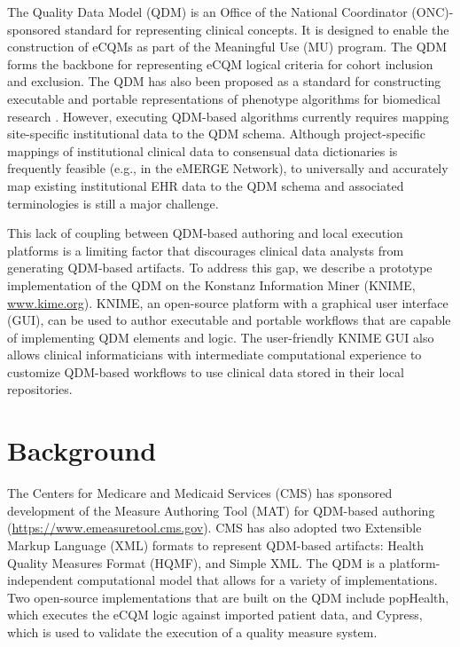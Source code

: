 \documentclass{article}
\begin{document}
The Quality Data Model (QDM) is an Office of the National Coordinator (ONC)-sponsored standard for representing clinical concepts\cite{_quality_2014}. It is designed to enable the construction of eCQMs as part of the Meaningful Use (MU) program. The QDM forms the backbone for representing eCQM logical criteria for cohort inclusion and exclusion. The QDM has also been proposed as a standard for constructing executable and portable representations of phenotype algorithms for biomedical research \cite{thompson_evaluation_2012}. However, executing QDM-based algorithms currently requires mapping site-specific institutional data to the QDM schema. Although project-specific mappings of institutional clinical data to consensual data dictionaries is frequently feasible (e.g., in the eMERGE Network\cite{kho_electronic_2011}), to universally and accurately map existing institutional EHR data to the QDM schema and associated terminologies is still a major challenge.

This lack of coupling between QDM-based authoring and local execution platforms is a limiting factor that discourages clinical data analysts from generating QDM-based artifacts. To address this gap, we describe a prototype implementation of the QDM on the Konstanz Information Miner (KNIME, \url{www.kime.org}). KNIME, an open-source platform with a graphical user interface (GUI), can be used to author executable and portable workflows that are capable of implementing QDM elements and logic. The user-friendly KNIME GUI also allows clinical informaticians with intermediate computational experience to customize QDM-based workflows to use clinical data stored in their local repositories.

\section{Background}

The Centers for Medicare and Medicaid Services (CMS) has sponsored development of the Measure Authoring Tool (MAT) for QDM-based authoring (\url{https://www.emeasuretool.cms.gov}). CMS has also adopted two Extensible Markup Language (XML) formats to represent QDM-based artifacts: Health Quality Measures Format (HQMF), and Simple XML. The QDM is a platform-independent computational model that allows for a variety of implementations. Two open-source implementations that are built on the QDM include popHealth, which executes the eCQM logic against imported patient data, and Cypress, which is used to validate the execution of a quality measure system.  
\end{document}
